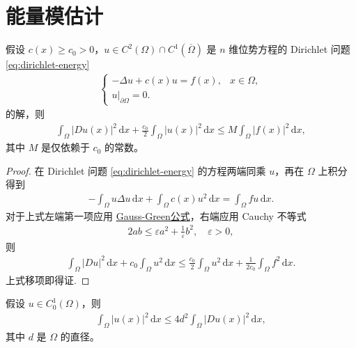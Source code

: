 \documentclass[../../main.tex]{subfiles}%
\begin{document}
\section{能量模估计}

\begin{theorem}
假设 $c(x)\geqslant c_0>0$，$u\in C^2(\Omega)\cap C^1(\overline{\Omega})$ 是 $n$ 维位势方程的 Dirichlet 问题\eqref{eq:dirichlet-energy}
\begin{align}
\begin{cases}
-\Delta u + c(x)u = f(x), & x\in\Omega, \\
u|_{\partial\Omega} = 0.
\end{cases} \label{eq:dirichlet-energy}
\end{align}
的解，则
\begin{align}
\int_\Omega |Du(x)|^2\,\mathrm{d}x + \frac{c_0}{2}\int_\Omega |u(x)|^2\,\mathrm{d}x \leqslant M\int_\Omega |f(x)|^2\,\mathrm{d}x, \label{eq:energy-est-dir}
\end{align}
其中 $M$ 是仅依赖于 $c_0$ 的常数。
\end{theorem}

\begin{proof}
在 Dirichlet 问题 \eqref{eq:dirichlet-energy} 的方程两端同乘 $u$，再在 $\Omega$ 上积分得到
\begin{align*}
-\int_\Omega u\Delta u\,\mathrm{d}x + \int_\Omega c(x)u^2\,\mathrm{d}x = \int_\Omega fu\,\mathrm{d}x.
\end{align*}
对于上式左端第一项应用 \hyperref[Basis of Analytics-theorem:Gauss-Green公式(散度定理)]{Gauss-Green公式}，右端应用 Cauchy 不等式
\begin{align*}
2ab \leqslant \varepsilon a^2 + \frac{1}{\varepsilon}b^2,\quad \varepsilon>0,
\end{align*}
则
\begin{align*}
\int_\Omega |Du|^2\,\mathrm{d}x + c_0\int_\Omega u^2\,\mathrm{d}x \leqslant \frac{c_0}{2}\int_\Omega u^2\,\mathrm{d}x + \frac{1}{2c_0}\int_\Omega f^2\,\mathrm{d}x.
\end{align*}
上式移项即得证.
\end{proof}

\begin{lemma}
假设 $u\in C_0^1(\Omega)$，则
\begin{align}
\int_\Omega |u(x)|^2\,\mathrm{d}x \leqslant 4d^2\int_\Omega |Du(x)|^2\,\mathrm{d}x, \label{eq:friedrichs}
\end{align}
其中 $d$ 是 $\Omega$ 的直径。
\end{lemma}
\end{document}
